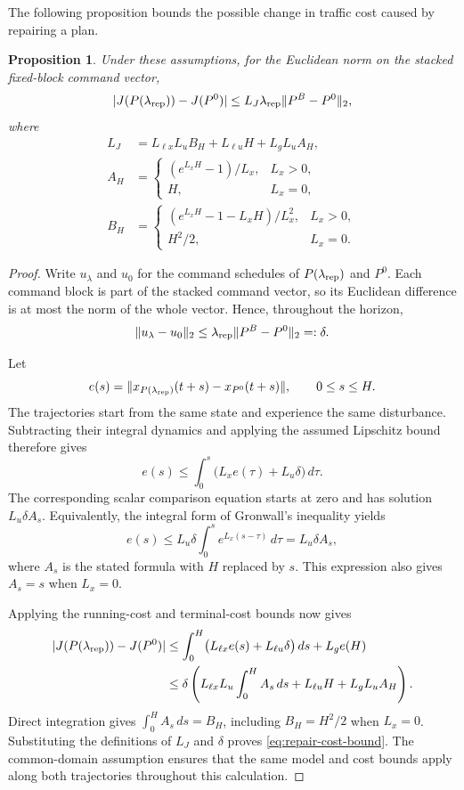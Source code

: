 \documentclass[preprint,12pt]{elsarticle}
\newtheorem{proposition}{Proposition}
\begin{document}
The following proposition bounds the possible change in traffic cost caused by repairing a plan.

\begin{proposition}
\label{prop:repair-cost}
Under these assumptions, for the Euclidean norm on the stacked fixed-block
command vector,
\begin{equation}
|J(P(\lambda_{\rm rep}))-J(P^0)|
\le L_J\lambda_{\rm rep}\|P^B-P^0\|_2,
\label{eq:repair-cost-bound}
\end{equation}
where
\begin{align*}
L_J&=L_{\ell x}L_u B_H+L_{\ell u}H+L_gL_u A_H,\\
A_H&=\begin{cases}(e^{L_xH}-1)/L_x,&L_x>0,\\H,&L_x=0,\end{cases}\\
B_H&=\begin{cases}(e^{L_xH}-1-L_xH)/L_x^2,&L_x>0,\\H^2/2,&L_x=0.\end{cases}
\end{align*}
\end{proposition}
\begin{proof}
Write $u_\lambda$ and $u_0$ for the command schedules of
$P(\lambda_{\rm rep})$ and $P^0$. Each command block is part of the
stacked command vector, so its Euclidean difference is at most the norm
of the whole vector. Hence, throughout the horizon,
\[
 \|u_\lambda-u_0\|_2
 \le\lambda_{\rm rep}\|P^B-P^0\|_2=:\delta.
\]

Let
\[
 e(s)=\|x_{P(\lambda_{\rm rep})}(t+s)-x_{P^0}(t+s)\|,
 \qquad 0\le s\le H.
\]
The trajectories start from the same state and experience the same
disturbance. Subtracting their integral dynamics and applying the assumed
Lipschitz bound therefore gives
\[
 e(s)\le\int_0^s\bigl(L_xe(\tau)+L_u\delta\bigr)\,d\tau.
\]
The corresponding scalar comparison equation starts at zero and has
solution $L_u\delta A_s$. Equivalently, the integral form of Gronwall's
inequality yields
\[
 e(s)\le L_u\delta\int_0^s e^{L_x(s-\tau)}\,d\tau
       =L_u\delta A_s,
\]
where $A_s$ is the stated formula with $H$ replaced by $s$. This expression
also gives $A_s=s$ when $L_x=0$.

Applying the running-cost and terminal-cost bounds now gives
\[
\begin{aligned}
 |J(P(\lambda_{\rm rep}))-J(P^0)|
 &\le\int_0^H
       \bigl(L_{\ell x}e(s)+L_{\ell u}\delta\bigr)\,ds
       +L_g e(H)\\
 &\le\delta\left(
       L_{\ell x}L_u\int_0^H A_s\,ds
       +L_{\ell u}H+L_gL_uA_H\right).
\end{aligned}
\]
Direct integration gives $\int_0^H A_s\,ds=B_H$, including
$B_H=H^2/2$ when $L_x=0$. Substituting the definitions of $L_J$ and
$\delta$ proves \eqref{eq:repair-cost-bound}. The common-domain assumption
ensures that the same model and cost bounds apply along both trajectories
throughout this calculation.
\end{proof}
\end{document}
